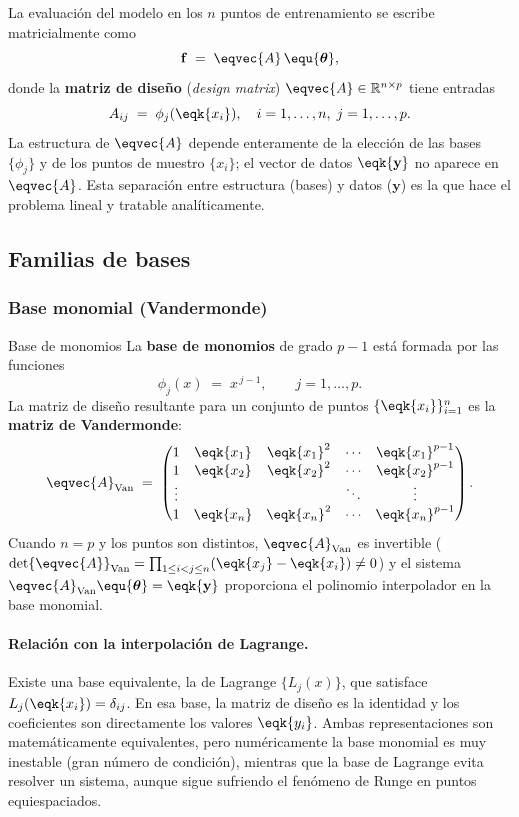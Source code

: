 La evaluación del modelo en los $n$ puntos de entrenamiento se escribe
matricialmente como
\[
  \mathbf{f} \;=\; \eqvec{A}\,\equ{\boldsymbol{\theta}},
\]
donde la \textbf{matriz de diseño} (\textit{design matrix})
$\eqvec{A} \in \mathbb{R}^{n \times p}$ tiene entradas
\[
  A_{ij} \;=\; \phi_j(\eqk{x_i}), \quad i = 1,\ldots,n,\; j = 1,\ldots,p.
\]
La estructura de $\eqvec{A}$ depende enteramente de la elección de las
bases $\{\phi_j\}$ y de los puntos de muestro $\{x_i\}$; el vector de
datos $\eqk{\mathbf{y}}$ no aparece en $\eqvec{A}$. Esta separación entre
estructura (bases) y datos ($\mathbf{y}$) es la que hace el problema lineal
y tratable analíticamente.

\subsection*{Familias de bases}
\label{sec:familias_bases}

\subsubsection{Base monomial (Vandermonde)}
\label{sec:vandermonde}

\begin{definicion}{Base de monomios}
\label{def:monomios}
La \textbf{base de monomios} de grado $p-1$ está formada por las funciones
\[
  \phi_j(x) \;=\; x^{\,j-1}, \qquad j = 1, \dots, p.
\]
La matriz de diseño resultante para un conjunto de puntos $\{\eqk{x_i}\}_{i=1}^n$ es la
\textbf{matriz de Vandermonde}:
\[
  \eqvec{A}_{\mathrm{Van}} \;=\; \begin{pmatrix}
    1 & \eqk{x_1} & \eqk{x_1}^2 & \cdots & \eqk{x_1}^{p-1} \\
    1 & \eqk{x_2} & \eqk{x_2}^2 & \cdots & \eqk{x_2}^{p-1} \\
    \vdots & & & \ddots & \vdots \\
    1 & \eqk{x_n} & \eqk{x_n}^2 & \cdots & \eqk{x_n}^{p-1}
  \end{pmatrix}.
\]
Cuando $n=p$ y los puntos son distintos, $\eqvec{A}_{\mathrm{Van}}$ es invertible
($\det \eqvec{A}_{\mathrm{Van}} = \prod_{1\le i<j\le n}(\eqk{x_j}-\eqk{x_i}) \neq 0$) y el sistema
$\eqvec{A}_{\mathrm{Van}}\equ{\boldsymbol{\theta}}=\eqk{\mathbf{y}}$ proporciona el polinomio
interpolador en la base monomial.
\end{definicion}

\paragraph{Relación con la interpolación de Lagrange.}
Existe una base equivalente, la de Lagrange $\{L_j(x)\}$, que satisface
$L_j(\eqk{x_i})=\delta_{ij}$. En esa base, la matriz de diseño es la identidad y
los coeficientes son directamente los valores $\eqk{y_i}$. Ambas representaciones son
matemáticamente equivalentes, pero numéricamente la base monomial es muy inestable
(gran número de condición), mientras que la base de Lagrange evita resolver un sistema,
aunque sigue sufriendo el fenómeno de Runge en puntos equiespaciados.

